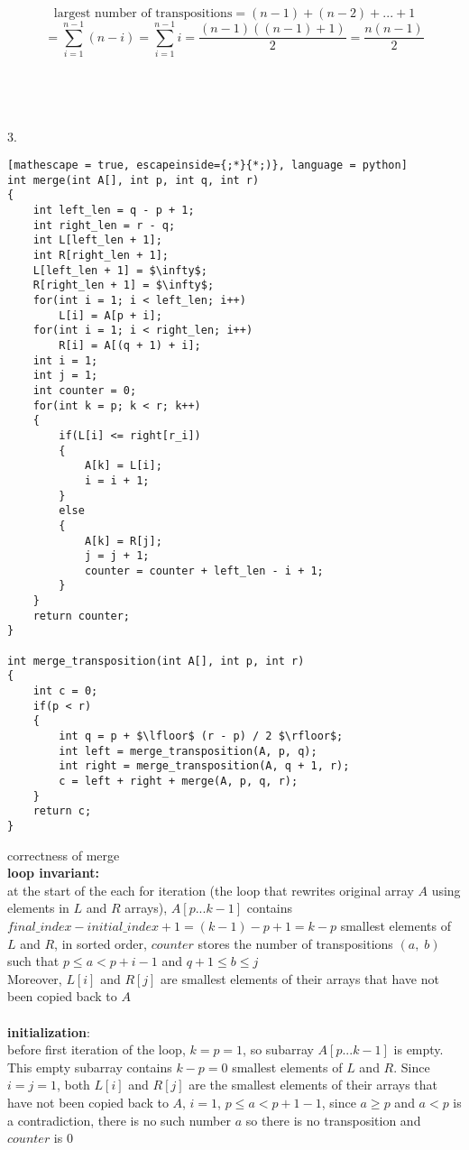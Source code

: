 \documentclass[12pt,border=4pt,multi]{article}%
\begin{document}
\[\text{largest number of transpositions} = (n - 1) + (n - 2) + ... + 1\]
\[= \sum_{i = 1}^{n - 1} (n - i) = \sum_{i = 1}^{n - 1} i = \frac{(n - 1)((n - 1) + 1)}{2} = \frac{n(n - 1)}{2}\]
\\
\\
\\
\\
3.\\
\begin{lstlisting}[mathescape = true, escapeinside={;*}{*;)}, language = python]
int merge(int A[], int p, int q, int r)
{
    int left_len = q - p + 1; 
    int right_len = r - q;
    int L[left_len + 1];
    int R[right_len + 1];
    L[left_len + 1] = $\infty$;
    R[right_len + 1] = $\infty$;
    for(int i = 1; i < left_len; i++)
        L[i] = A[p + i];
    for(int i = 1; i < right_len; i++)
        R[i] = A[(q + 1) + i];
    int i = 1;
    int j = 1;
    int counter = 0;
    for(int k = p; k < r; k++)
    {
        if(L[i] <= right[r_i])
        {
            A[k] = L[i];
            i = i + 1;
        }
        else
        {
            A[k] = R[j];
            j = j + 1;
            counter = counter + left_len - i + 1;
        }
    }
    return counter;
}

int merge_transposition(int A[], int p, int r)
{
    int c = 0;
    if(p < r)
    {
        int q = p + $\lfloor$ (r - p) / 2 $\rfloor$;
        int left = merge_transposition(A, p, q);
        int right = merge_transposition(A, q + 1, r);
        c = left + right + merge(A, p, q, r);
    }
    return c;
}
\end{lstlisting}
\newpage
\noindent
correctness of merge\\
\textbf{loop invariant:}\\
at the start of the each for iteration (the loop that rewrites original array $A$ using elements in $L$ and $R$ arrays), $A[p...k - 1]$ contains $final\_index - initial\_index + 1 = (k - 1) - p + 1 = k - p$ smallest elements of $L$ and $R$, in sorted order, $counter$ stores the number of transpositions $(a,\;b)$ such that $p \leq a < p + i - 1$ and $q + 1 \leq b \leq j$\\
Moreover, $L[i]$ and $R[j]$ are smallest elements of their arrays that have not been copied back to $A$\\
\\
\textbf{initialization}:\\ 
before first iteration of the loop, $k = p = 1$, so subarray $A[p...k - 1]$ is empty. This empty subarray contains $k - p = 0$ smallest elements of $L$ and $R$. Since $i = j = 1$, both $L[i]$ and $R[j]$ are the smallest elements of their arrays that have not been copied back to $A$, $i = 1$, $p \leq a < p + 1 - 1$, since $a \geq p$ and $a < p$ is a contradiction, there is no such number $a$ so there is no transposition and $counter$ is 0\\
\end{document}
